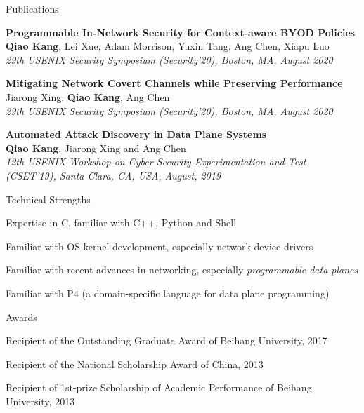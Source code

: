 \documentclass{resume} %
\begin{document}
\begin{rSection}{Publications}

\item {\bf Programmable In-Network Security for Context-aware BYOD Policies}\\
{\bf Qiao Kang}, Lei Xue, Adam Morrison, Yuxin Tang, Ang Chen, Xiapu Luo\\
{\em 29th USENIX Security Symposium (Security'20), Boston, MA, August 2020}

\item {\bf Mitigating Network Covert Channels while Preserving Performance}\\
Jiarong Xing, {\bf Qiao Kang}, Ang Chen\\
{\em 29th USENIX Security Symposium (Security'20), Boston, MA, August 2020}

\item {\bf Automated Attack Discovery in Data Plane Systems}\\
{\bf Qiao Kang}, Jiarong Xing and Ang Chen\\
{\em 12th USENIX Workshop on Cyber Security Experimentation and Test (CSET'19), Santa Clara, CA, USA, August, 2019}

\end{rSection}


\begin{rSection}{Technical Strengths} \itemsep -3pt

\item Expertise in C, familiar with C++, Python and Shell
\item Familiar with OS kernel development, especially network device drivers
\item Familiar with recent advances in networking, especially {\em programmable data planes}
\item Familiar with P4 (a domain-specific language for data plane programming)

\end{rSection}


\begin{rSection}{Awards} \itemsep -3pt
\item Recipient of the Outstanding Graduate Award of Beihang University, 2017
\item Recipient of the National Scholarship Award of China, 2013
\item Recipient of 1st-prize Scholarship of Academic Performance of Beihang University, 2013

\end{rSection}
\end{document}

